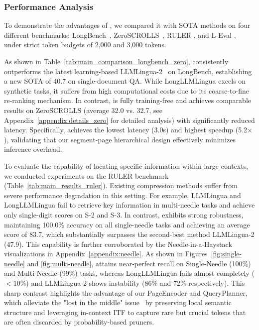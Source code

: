 \documentclass[11pt]{article}
\newcommand{\ours}{\text{BEAVER}\xspace}
\begin{document}
\subsubsection{Performance Analysis}
To demonstrate the advantages of \ours, we compared it with SOTA methods on four different benchmarks: LongBench~\cite{bai2024longbench}, ZeroSCROLLS~\cite{shaham2023zeroscrolls}, RULER \cite{hsieh2024ruler}, and L-Eval \cite{an2024eval}, under strict token budgets of 2,000 and 3,000 tokens.

As shown in Table~\ref{tab:main_comparison_longbench_zero}, \ours consistently outperforms the latest learning-based LLMLingua-2~\cite{pan2024llmlingua2} on LongBench, establishing a new SOTA of 40.7 on single-document QA. While LongLLMLingua \cite{jiang2024longllmlingua} excels on synthetic tasks, it suffers from high computational costs due to its coarse-to-fine re-ranking mechanism. In contrast, \ours is fully training-free and achieves comparable results on ZeroSCROLLS (average 32.0 vs. 32.7, see Appendix~\ref{appendix:details_zero} for detailed analysis) with significantly reduced latency. Specifically, \ours achieves the lowest latency (3.0s) and highest speedup (5.2$\times$), validating that our segment-page hierarchical design effectively minimizes inference overhead.

To evaluate the capability of locating specific information within large contexts, we conducted experiments on the RULER benchmark (Table~\ref{tab:main_results_ruler}). Existing compression methods suffer from severe performance degradation in this setting. For example, LLMLingua and LongLLMLingua fail to retrieve key information in multi-needle tasks and achieve only single-digit scores on S-2 and S-3. In contrast, \ours exhibits strong robustness, maintaining 100.0\% accuracy on all single-needle tasks and achieving an average score of 83.7, which substantially surpasses the second-best method LLMLingua-2 (47.9). This capability is further corroborated by the Needle-in-a-Haystack visualizations in Appendix~\ref{appendix:needle}. As shown in Figures~\ref{fig:single-needle} and \ref{fig:multi-needle}, \ours attains near-perfect recall on Single-Needle (100\%) and Multi-Needle (99\%) tasks, whereas LongLLMLingua fails almost completely ($<10\%$) and LLMLingua-2 shows instability (86\% and 72\% respectively). This sharp contrast highlights the advantage of our PageEncoder and QueryPlanner, which alleviate the "lost in the middle" issue~\cite{liu2024lost} by preserving local semantic structure and leveraging in-context ITF to capture rare but crucial tokens that are often discarded by probability-based pruners.
\end{document}

